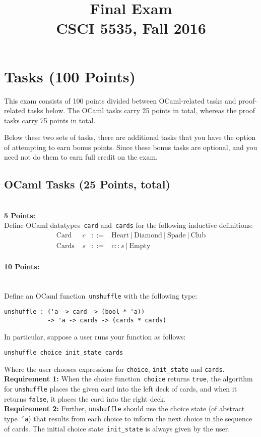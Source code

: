 \documentclass{article}
\title{Final Exam\\
  CSCI 5535, Fall 2016}
\begin{document}
\maketitle

\section*{Tasks (100 Points)}

This exam consists of 100 points divided between OCaml-related tasks
and proof-related tasks below.
%
The OCaml tasks carry 25 points in total, whereas the proof tasks
carry 75 points in total.

Below these two sets of tasks, there are additional tasks that you
have the option of attempting to earn bonus points.  Since these bonus
tasks are optional, and you need not do them to earn full credit on
the exam.

\subsection*{OCaml Tasks (25 Points, total)}~\\

\noindent
\textbf{5 Points:}\\
Define OCaml datatypes~\texttt{card} and~\texttt{cards} for the following inductive definitions:
\[\begin{array}{ccll}
\textrm{Card }  & c & ::= & \textrm{Heart} ~|~ \textrm{Diamond} ~|~ \textrm{Spade} ~|~ \textrm{Club}
\\
\textrm{Cards } & s & ::= & c :: s ~|~ \textrm{Empty}
\end{array}
\]

\paragraph{10 Points:}~\\
Define an OCaml function~\texttt{unshuffle} with the following type:
\begin{verbatim}
unshuffle : ('a -> card -> (bool * 'a))
            -> 'a -> cards -> (cards * cards)
\end{verbatim}
In particular, suppose a user runs your function as follows:
\begin{verbatim}
unshuffle choice init_state cards
\end{verbatim}
Where the user chooses expressions for \texttt{choice}, \texttt{init\_state} and \texttt{cards}.
\\[2mm]
\noindent
\textbf{Requirement 1:} When the choice
function~\texttt{choice} returns \texttt{true}, the algorithm for
\texttt{unshuffle} places the given card into the left deck of cards,
and when it returns \texttt{false}, it places the card into the right
deck.
\\[2mm]
\noindent
\textbf{Requirement 2:} Further, \texttt{unshuffle} should use the
choice state (of abstract type~\texttt{'a}) that results from each
choice to inform the next choice in the sequence of cards.
%
The initial choice state~\texttt{init\_state} is always given by the
user.
\end{document}
